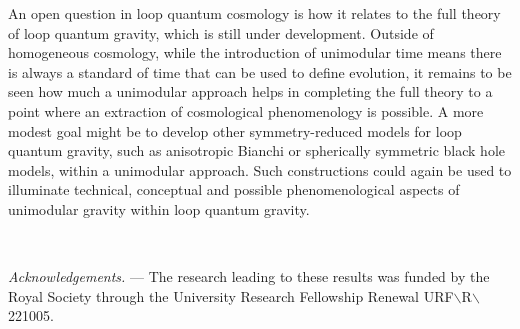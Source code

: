 \documentclass[aps,prd,11pt,showkeys,nofootinbib]{revtex4-2}
\begin{document}
An open question in loop quantum cosmology is how it relates to the full theory of loop quantum gravity, which is still under development. Outside of homogeneous cosmology, while the introduction of unimodular time means there is always a standard of time that can be used to define evolution, it remains to be seen how much a unimodular approach helps in completing the full theory to a point where an extraction of cosmological phenomenology is possible. A more modest goal might be to develop other symmetry-reduced models for loop quantum gravity, such as anisotropic Bianchi or spherically symmetric black hole models, within a unimodular approach. Such constructions could again be used to illuminate technical, conceptual and possible phenomenological aspects of unimodular gravity within loop quantum gravity. 

\

{\em Acknowledgements.} --- The research leading to these results was  funded by the Royal Society through the University Research Fellowship Renewal URF$\backslash$R$\backslash$221005.



\end{document}

